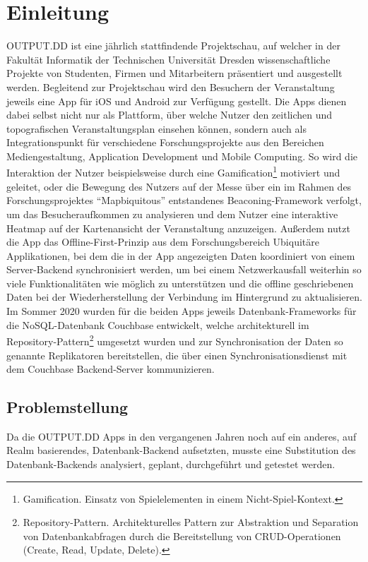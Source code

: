 \chapter{Einleitung}\label{ch:einleitung}

OUTPUT.DD ist eine jährlich stattfindende Projektschau, auf welcher in der Fakultät Informatik der Technischen Universität Dresden wissenschaftliche Projekte von Studenten, Firmen und Mitarbeitern präsentiert und ausgestellt werden. Begleitend zur Projektschau wird den Besuchern der Veranstaltung jeweils eine App für iOS und Android zur Verfügung gestellt. Die Apps dienen dabei selbst nicht nur als Plattform, über welche Nutzer den zeitlichen und topografischen Veranstaltungsplan einsehen können, sondern auch als Integrationspunkt für verschiedene Forschungsprojekte aus den Bereichen Mediengestaltung, Application Development und Mobile Computing. So wird die Interaktion der Nutzer beispielsweise durch eine Gamification\footnote{Gamification. Einsatz von Spielelementen in einem Nicht-Spiel-Kontext.} motiviert und geleitet, oder die Bewegung des Nutzers auf der Messe über ein im Rahmen des Forschungsprojektes \enquote{Mapbiquitous} entstandenes Beaconing-Framework verfolgt, um das Besucheraufkommen zu analysieren und dem Nutzer eine interaktive Heatmap auf der Kartenansicht der Veranstaltung anzuzeigen. Außerdem nutzt die App das Offline-First-Prinzip aus dem Forschungsbereich Ubiquitäre Applikationen, bei dem die in der App angezeigten Daten koordiniert von einem Server-Backend synchronisiert werden, um bei einem Netzwerkausfall weiterhin so viele Funktionalitäten wie möglich zu unterstützen und die offline geschriebenen Daten bei der Wiederherstellung der Verbindung im Hintergrund zu aktualisieren. Im Sommer 2020 wurden für die beiden Apps jeweils Datenbank-Frameworks für die NoSQL-Datenbank Couchbase entwickelt, welche architekturell im Repository-Pattern\footnote{Repository-Pattern. Architekturelles Pattern zur Abstraktion und Separation von Datenbankabfragen durch die Bereitstellung von CRUD-Operationen (Create, Read, Update, Delete).} umgesetzt wurden und zur Synchronisation der Daten so genannte Replikatoren bereitstellen, die über einen Synchronisationsdienst mit dem Couchbase Backend-Server kommunizieren.

\section{Problemstellung}

Da die OUTPUT.DD Apps in den vergangenen Jahren noch auf ein anderes, auf Realm basierendes, Datenbank-Backend aufsetzten, musste eine Substitution des Datenbank-Backends analysiert, geplant, durchgeführt und getestet werden.

